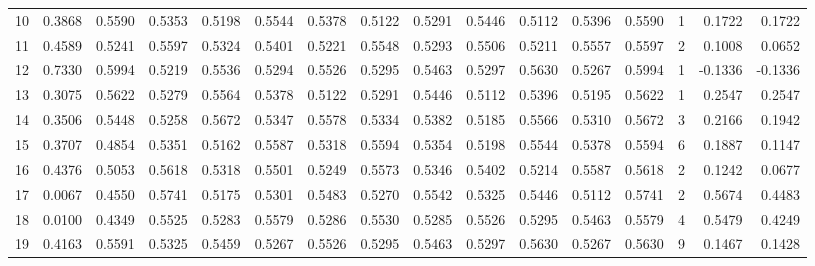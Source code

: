\begin{tabular}{lrrrrrrrrrrrrrrr}
10 &      0.3868 &  0.5590 &  0.5353 &  0.5198 &  0.5544 &  0.5378 &  0.5122 &  0.5291 &  0.5446 &  0.5112 &   0.5396 &     0.5590 &      1 &                    0.1722 &                     0.1722 \\
11 &      0.4589 &  0.5241 &  0.5597 &  0.5324 &  0.5401 &  0.5221 &  0.5548 &  0.5293 &  0.5506 &  0.5211 &   0.5557 &     0.5597 &      2 &                    0.1008 &                     0.0652 \\
12 &      0.7330 &  0.5994 &  0.5219 &  0.5536 &  0.5294 &  0.5526 &  0.5295 &  0.5463 &  0.5297 &  0.5630 &   0.5267 &     0.5994 &      1 &                   -0.1336 &                    -0.1336 \\
13 &      0.3075 &  0.5622 &  0.5279 &  0.5564 &  0.5378 &  0.5122 &  0.5291 &  0.5446 &  0.5112 &  0.5396 &   0.5195 &     0.5622 &      1 &                    0.2547 &                     0.2547 \\
14 &      0.3506 &  0.5448 &  0.5258 &  0.5672 &  0.5347 &  0.5578 &  0.5334 &  0.5382 &  0.5185 &  0.5566 &   0.5310 &     0.5672 &      3 &                    0.2166 &                     0.1942 \\
15 &      0.3707 &  0.4854 &  0.5351 &  0.5162 &  0.5587 &  0.5318 &  0.5594 &  0.5354 &  0.5198 &  0.5544 &   0.5378 &     0.5594 &      6 &                    0.1887 &                     0.1147 \\
16 &      0.4376 &  0.5053 &  0.5618 &  0.5318 &  0.5501 &  0.5249 &  0.5573 &  0.5346 &  0.5402 &  0.5214 &   0.5587 &     0.5618 &      2 &                    0.1242 &                     0.0677 \\
17 &      0.0067 &  0.4550 &  0.5741 &  0.5175 &  0.5301 &  0.5483 &  0.5270 &  0.5542 &  0.5325 &  0.5446 &   0.5112 &     0.5741 &      2 &                    0.5674 &                     0.4483 \\
18 &      0.0100 &  0.4349 &  0.5525 &  0.5283 &  0.5579 &  0.5286 &  0.5530 &  0.5285 &  0.5526 &  0.5295 &   0.5463 &     0.5579 &      4 &                    0.5479 &                     0.4249 \\
19 &      0.4163 &  0.5591 &  0.5325 &  0.5459 &  0.5267 &  0.5526 &  0.5295 &  0.5463 &  0.5297 &  0.5630 &   0.5267 &     0.5630 &      9 &                    0.1467 &                     0.1428 \\
\bottomrule
\end{tabular}
